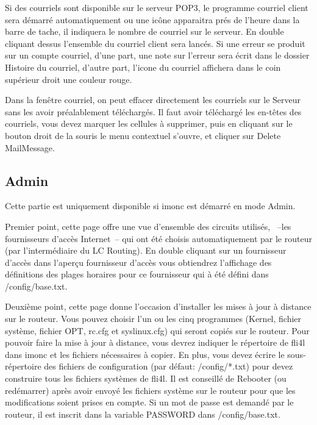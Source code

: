   Si des \mbox{courriels} sont disponible sur le serveur POP3, le programme
  \mbox{courriel} client sera démarré automatiquement ou une icône apparaitra
  prés de l'heure dans la barre de tache, il indiquera le nombre de \mbox{courriel}
  sur le serveur. En double cliquant dessus l'ensemble du \mbox{courriel} client
  sera lancés. Si une erreur se produit sur un compte \mbox{courriel}, d'une part,
  une note sur l'erreur sera écrit dans le dossier Histoire du \mbox{courriel},
  d'autre part, l'icone du \mbox{courriel} affichera dans le coin supérieur droit
  une couleur rouge.

  Dans la fenêtre \mbox{courriel}, on peut effacer directement les \mbox{courriels} sur le
  Serveur sans les avoir préalablement téléchargés. Il faut avoir téléchargé
  les en-têtes des courriels, vous devez marquer les cellules à supprimer, puis
  en cliquant sur le bouton droit de la souris le menu contextuel s'ouvre,
  et cliquer sur Delete MailMessage.

  \subsection{Admin}

  Cette partie est uniquement disponible si imonc est démarré en mode Admin.

  Premier point, cette page offre une vue d'ensemble des circuits utilisés,
  ~--les fournisseurs d'accès Internet~-- qui ont été choisis automatiquement
  par le routeur (par l'intermédiaire du LC Routing). En double cliquant sur un
  fournisseur d'accès dans l'aperçu fournisseur d'accès vous obtiendrez
  l'affichage des définitions des plages horaires pour ce fournisseur qui à été
  défini dans /config/base.txt.

  Deuxième point, cette page donne l'occasion d'installer les mises à jour à
  distance sur le routeur. Vous pouvez choisir l'un ou les cinq programmes
  (Kernel, fichier système, fichier OPT, rc.cfg et syslinux.cfg) qui seront
  copiés sur le routeur. Pour pouvoir faire la mise à jour à distance, vous
  devrez indiquer le répertoire de fli4l dans imonc et les fichiers nécessaires
  à copier. En plus, vous devez écrire le sous-répertoire des fichiers de
  configuration (par défaut: /config/*.txt) pour devez construire tous les
  fichiers systèmes de fli4l. Il est conseillé de Rebooter (ou redémarrer) après
  avoir envoyé les fichiers système sur le routeur pour que les modifications
  soient prises en compte. Si un mot de passe est demandé par le routeur, il
  est inscrit dans la variable PASSWORD dans /config/base.txt.

